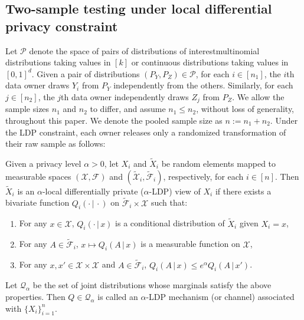 \documentclass[twoside,11pt]{article}
\newcommand{\distClassGeneric}{\mathcal{P}}
\newcommand{\rvOne}{X}
\newcommand{\sigmafield}{\mathcal{F}}
\newcommand{\sigmafieldPriv}{\tilde{\mathcal{F}}}
\newcommand{\rvX}{X} %
\newcommand{\rvXCodomain}{\mathcal{\rvX}} %
\newcommand{\rvXPrivCodomain}{\tilde{\rvXCodomain}}
\newcommand{\rvY}{Y}
\newcommand{\rvZ}{Z}
\newcommand{\sampleIndexOne}{i}
\newcommand{\sampleIndexTwo}{j}
\newcommand{\dimDensity}{d} %
\newcommand{\sampleSize}{n}
\newcommand{\privacyMechanism}{Q}
\newcommand{\privacyMechanismClass}{\mathcal{Q}}
\newcommand{\privacyParameter}{\alpha} %
\begin{document}
\subsection{Two-sample testing under local differential privacy constraint}\label{subsection:LDPtwosampleFormulation}
Let $\distClassGeneric$ denote the space of pairs of distributions of interest{\textemdash}multinomial distributions taking values in $[k]$ or continuous distributions taking values in $[0,1]^{\dimDensity}$. Given a pair of distributions $(P_\rvY, P_\rvZ) \in \distClassGeneric$, for each $\sampleIndexOne \in [\sampleSize_1]$, the $\sampleIndexOne$th  data owner draws $\rvY_\sampleIndexOne$ from $P_\rvY$ independently from the others. Similarly, for each $\sampleIndexTwo \in [\sampleSize_2]$,  the $\sampleIndexTwo$th data owner independently draws $\rvZ_\sampleIndexTwo$ from $P_\rvZ$.
We allow the sample sizes $\sampleSize_1$ and $\sampleSize_2$ to differ, and assume $\sampleSize_1 \leq \sampleSize_2$, without loss of generality, throughout this paper.  We denote the pooled sample size as $\sampleSize := \sampleSize_1 + \sampleSize_2$. Under the LDP constraint, each owner releases only a randomized transformation of their raw sample as follows:
\begin{definition}\label{def:LDP}
	Given a privacy level $\privacyParameter > 0$, let $X_i$ and $\tilde{X}_i$ be random elements  mapped to measurable spaces $(\rvXCodomain, \sigmafield)$ and $(\rvXPrivCodomain_i, \sigmafieldPriv_\sampleIndexOne)$, respectively, for each $i \in [n]$. Then $\tilde{X}_i$ is an $\privacyParameter$-local differentially private ($\privacyParameter$-LDP) view of $X_i$ if there exists a bivariate function $Q_\sampleIndexOne(\cdot \,|\, \cdot)$ on $\sigmafieldPriv_\sampleIndexOne \times \rvXCodomain$  such that:
	\begin{enumerate}
		\item For any $x \in \rvXCodomain$, $Q_\sampleIndexOne ( \cdot \,|\, x)$ is a conditional distribution of $\tilde{X}_i$ given $X_i=x$,
		\item For any $A \in \sigmafieldPriv_\sampleIndexOne$, $x \mapsto Q_\sampleIndexOne (A\,|\,x) $ is a measurable function on $\rvXCodomain$,~
		\item For any $x, x' \in \rvXCodomain \times \rvXCodomain$ and $A \in \sigmafieldPriv_i$, 
		$Q_\sampleIndexOne
		(
		A\,|\,x
		)  \leq  e^{\privacyParameter}	Q_\sampleIndexOne
		(
		A\,|\,
		x'
		)$.
	\end{enumerate}
	Let $\privacyMechanismClass_\privacyParameter$
	be the set of joint distributions whose marginals satisfy the above properties.
	Then $\privacyMechanism \in \privacyMechanismClass_\privacyParameter$ is called an $\privacyParameter$-LDP mechanism (or channel) associated with $\{\rvOne_\sampleIndexOne\}_{\sampleIndexOne=1}^\sampleSize$.
\end{definition}
\end{document}
